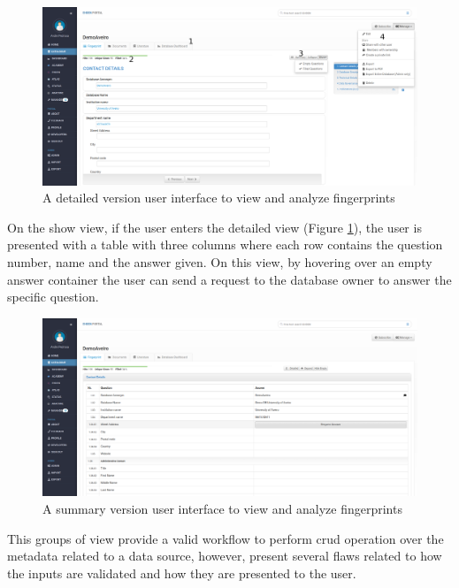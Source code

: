 \begin{figure}[h]
    \center
    \includegraphics[width=\textwidth]{fingerprint-show-detailed}
    \caption{A detailed version user interface to view and analyze fingerprints}
    \label{fig:fingerprint-show-detailed}
\end{figure}

On the show view, if the user enters the detailed view (Figure \ref{fig:fingerprint-show-detailed}), the user is presented with a table with three columns where each row contains the question number, name and the answer given.
On this view, by hovering over an empty answer container the user can send a request to the database owner to answer the specific question.

\begin{figure}[h]
    \center
    \includegraphics[width=\textwidth]{fingerprint-show-summary}
    \caption{A summary version user interface to view and analyze fingerprints}
    \label{fig:fingerprint-show-summary}
\end{figure}

This groups of view provide a valid workflow to perform \gls{crud} operation over the metadata related to a data source, however, present several flaws related to how the inputs are validated and how they are presented to the user.


